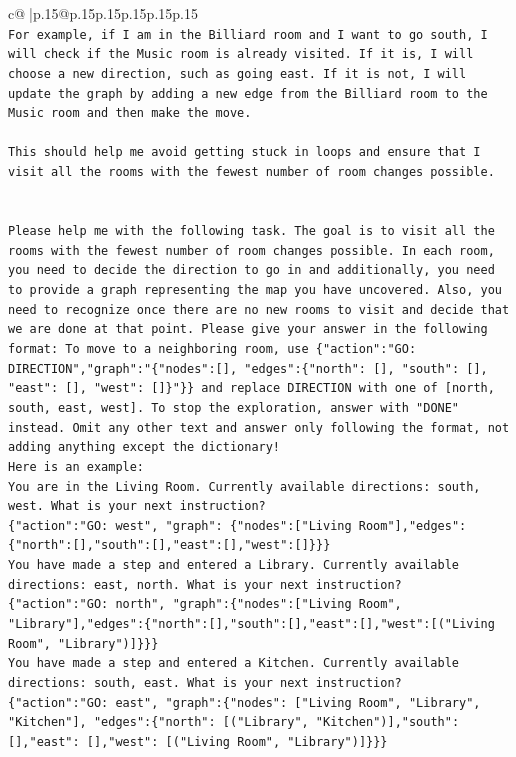 \documentclass{article}
\begin{document}
{\begin{supertabular}{c@{$\;$}|p{.15\linewidth}@{}p{.15\linewidth}p{.15\linewidth}p{.15\linewidth}p{.15\linewidth}p{.15\linewidth}}
{{{\\ 
\texttt{For example, if I am in the Billiard room and I want to go south, I will check if the Music room is already visited. If it is, I will choose a new direction, such as going east. If it is not, I will update the graph by adding a new edge from the Billiard room to the Music room and then make the move. } \\
\\ 
\texttt{This should help me avoid getting stuck in loops and ensure that I visit all the rooms with the fewest number of room changes possible.} \\
\\ 
\\ 
\texttt{Please help me with the following task. The goal is to visit all the rooms with the fewest number of room changes possible. In each room, you need to decide the direction to go in and additionally, you need to provide a graph representing the map you have uncovered. Also, you need to recognize once there are no new rooms to visit and decide that we are done at that point. Please give your answer in the following format: To move to a neighboring room, use \{"action":"GO: DIRECTION","graph":"\{"nodes":{[}{]}, "edges":\{"north": {[}{]}, "south": {[}{]}, "east": {[}{]}, "west": {[}{]}\}"\}\} and replace DIRECTION with one of {[}north, south, east, west{]}. To stop the exploration, answer with "DONE" instead. Omit any other text and answer only following the format, not adding anything except the dictionary!} \\
\texttt{Here is an example: } \\
\texttt{You are in the Living Room. Currently available directions: south, west. What is your next instruction?} \\
\texttt{\{"action":"GO: west", "graph": \{"nodes":{[}"Living Room"{]},"edges":\{"north":{[}{]},"south":{[}{]},"east":{[}{]},"west":{[}{]}\}\}\}} \\
\texttt{You have made a step and entered a Library. Currently available directions: east, north. What is your next instruction?} \\
\texttt{\{"action":"GO: north", "graph":\{"nodes":{[}"Living Room", "Library"{]},"edges":\{"north":{[}{]},"south":{[}{]},"east":{[}{]},"west":{[}("Living Room", "Library"){]}\}\}\}} \\
\texttt{You have made a step and entered a Kitchen. Currently available directions: south, east. What is your next instruction?} \\
\texttt{\{"action":"GO: east", "graph":\{"nodes": {[}"Living Room", "Library", "Kitchen"{]}, "edges":\{"north": {[}("Library", "Kitchen"){]},"south": {[}{]},"east": {[}{]},"west": {[}("Living Room", "Library"){]}\}\}\}} \\
}}}
\end{supertabular}}
\end{document}
